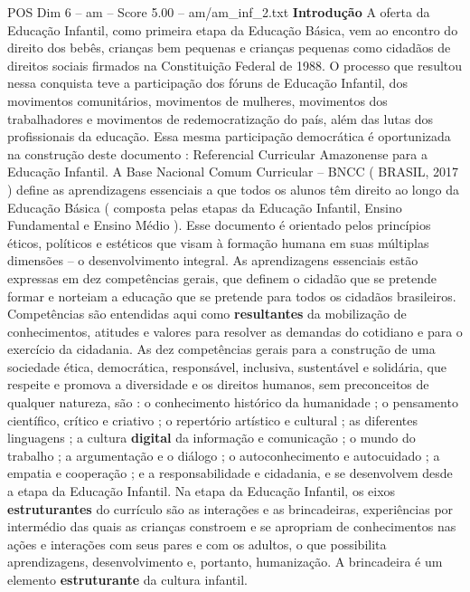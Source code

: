 \begin{textsample}{POS Dim 6 – am – Score 5.00 – am/am\_inf\_2.txt}  \label{ex:f6_pos_270}
\textbf{Introdução} A oferta da Educação Infantil, como primeira etapa da Educação Básica, vem ao encontro do direito dos bebês, crianças bem pequenas e crianças pequenas como cidadãos de direitos sociais firmados na Constituição Federal de 1988.
O processo que resultou nessa conquista teve a participação dos fóruns de Educação Infantil, dos movimentos comunitários, movimentos de mulheres, movimentos dos trabalhadores e movimentos de redemocratização do país, além das lutas dos profissionais da educação.
Essa mesma participação democrática é oportunizada na construção deste documento : Referencial Curricular Amazonense para a Educação Infantil.
A Base Nacional Comum Curricular – BNCC ( BRASIL, 2017 ) define as aprendizagens essenciais a que todos os alunos têm direito ao longo da Educação Básica ( composta pelas etapas da Educação Infantil, Ensino Fundamental e Ensino Médio ).
Esse documento é orientado pelos princípios éticos, políticos e estéticos que visam à formação humana em suas múltiplas dimensões – o desenvolvimento integral.
As aprendizagens essenciais estão expressas em dez competências gerais, que definem o cidadão que se pretende formar e norteiam a educação que se pretende para todos os cidadãos brasileiros.
Competências são entendidas aqui como \textbf{resultantes} da mobilização de conhecimentos, atitudes e valores para resolver as demandas do cotidiano e para o exercício da cidadania.
As dez competências gerais para a construção de uma sociedade ética, democrática, responsável, inclusiva, sustentável e solidária, que respeite e promova a diversidade e os direitos humanos, sem preconceitos de qualquer natureza, são : o conhecimento histórico da humanidade ; o pensamento científico, crítico e criativo ; o repertório artístico e cultural ; as diferentes linguagens ; a cultura \textbf{digital} da informação e comunicação ; o mundo do trabalho ; a argumentação e o diálogo ; o autoconhecimento e autocuidado ; a empatia e cooperação ; e a responsabilidade e cidadania, e se desenvolvem desde a etapa da Educação Infantil.
Na etapa da Educação Infantil, os eixos \textbf{estruturantes} do currículo são as interações e as brincadeiras, experiências por intermédio das quais as crianças constroem e se apropriam de conhecimentos nas ações e interações com seus pares e com os adultos, o que possibilita aprendizagens, desenvolvimento e, portanto, humanização.
A brincadeira é um elemento \textbf{estruturante} da cultura infantil.

\end{textsample}
